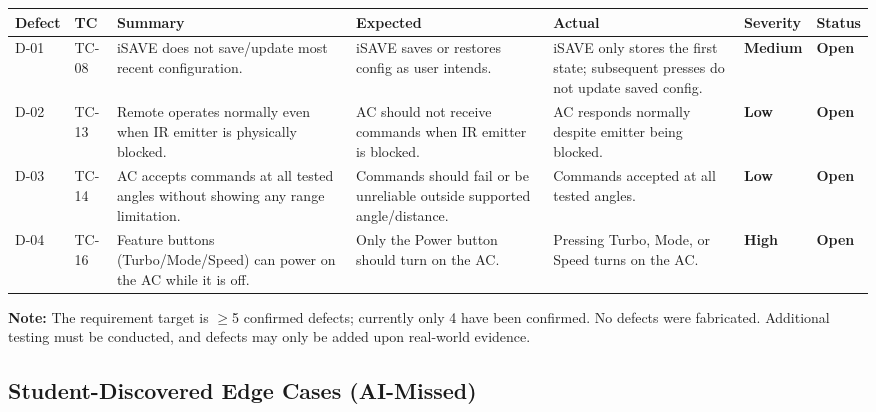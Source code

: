 \documentclass[12pt, a4paper]{article}
\newcommand{\sopen}{\textcolor{FailRed}{\textbf{Open}}}
\newcommand{\shigh}{\textcolor{HighSev}{\textbf{High}}}
\newcommand{\smed}{\textcolor{MedSev}{\textbf{Medium}}}
\newcommand{\slow}{\textcolor{LowSev}{\textbf{Low}}}
\begin{document}
\begin{table}[h!]
\centering
\begin{tabularx}{\textwidth}{@{} C{1.2cm} C{1.2cm} L{2.5cm} L{2.8cm} L{2.5cm} C{1.2cm} C{1.2cm} @{}}
\toprule
{}
\textbf{Defect} & \textbf{TC} & \textbf{Summary} & \textbf{Expected} & \textbf{Actual} & \textbf{Severity} & \textbf{Status} \\
\midrule
D-01 & TC-08 & iSAVE does not save/update most recent configuration. & iSAVE saves or restores config as user intends. & iSAVE only stores the first state; subsequent presses do not update saved config. & \smed & \sopen \\
D-02 & TC-13 & Remote operates normally even when IR emitter is physically blocked. & AC should not receive commands when IR emitter is blocked. & AC responds normally despite emitter being blocked. & \slow & \sopen \\
D-03 & TC-14 & AC accepts commands at all tested angles without showing any range limitation. & Commands should fail or be unreliable outside supported angle/distance. & Commands accepted at all tested angles. & \slow & \sopen \\
D-04 & TC-16 & Feature buttons (Turbo/Mode/Speed) can power on the AC while it is off. & Only the Power button should turn on the AC. & Pressing Turbo, Mode, or Speed turns on the AC. & \shigh & \sopen \\
\bottomrule
\end{tabularx}
\end{table}

\begin{infobox}
\textbf{Note:} The requirement target is $\geq$5 confirmed defects; currently only 4 have been confirmed. No defects were fabricated. Additional testing must be conducted, and defects may only be added upon real-world evidence.
\end{infobox}

\subsection{Student-Discovered Edge Cases (AI-Missed)}
\end{document}
